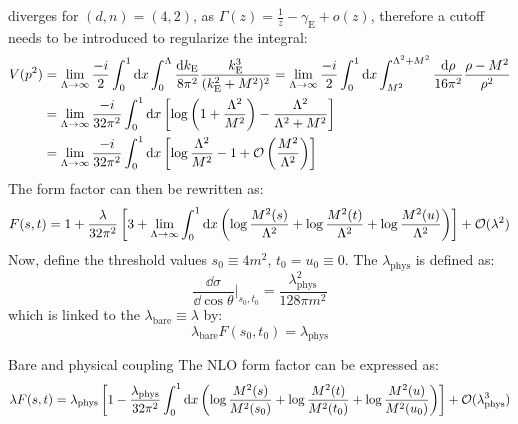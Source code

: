  diverges for $ (d,n) = (4,2) $, as $ \Gamma(z) = \frac{1}{z} - \gamma_\text{E} + o(z) $, therefore a cutoff needs to be introduced to regularize the integral:
\begin{equation*}
  \begin{split}
    V(p^2)
    & = \lim_{\Lambda \rightarrow \infty} \frac{-i}{2} \int_0^1 \mathrm{d} x \int_0^\Lambda \frac{\mathrm{d} k_\text{E}}{8\pi^2} \frac{k_\text{E}^3}{(k_\text{E}^2 + M^2)^2} = \lim_{\Lambda \rightarrow \infty} \frac{-i}{2} \int_0^1 \mathrm{d} x \int_{M^2}^{\Lambda^2 + M^2} \frac{\mathrm{d} \rho}{16\pi^2} \frac{\rho - M^2}{\rho^2} \\
    & = \lim_{\Lambda \rightarrow \infty} \frac{-i}{32 \pi^2} \int_0^1 \mathrm{d} x \left[ \log \left( 1 + \frac{\Lambda^2}{M^2} \right) - \frac{\Lambda^2}{\Lambda^2 + M^2} \right] \\
    & = \lim_{\Lambda \rightarrow \infty} \frac{-i}{32\pi^2} \int_0^1 \mathrm{d} x \left[ \log \frac{\Lambda^2}{M^2} - 1 + \mathcal{O}  \left( \frac{M^2}{\Lambda^2} \right) \right]
  \end{split}
\end{equation*}
The form factor can then be rewritten as:
\begin{equation}
  F(s,t) = 1 + \frac{\lambda}{32\pi^2} \left[ 3 + \lim_{\Lambda \rightarrow \infty} \int_0^1 \mathrm{d} x \left( \log \frac{M^2(s)}{\Lambda^2} + \log \frac{M^2(t)}{\Lambda^2} + \log \frac{M^2(u)}{\Lambda^2} \right) \right] + \mathcal{O}(\lambda^2)
  \label{eq:form-factor}
\end{equation}
Now, define the threshold values $ s_0 \equiv 4m^2 $, $ t_0 = u_0 \equiv 0 $. The  $ \lambda_\text{phys} $ is defined as:
\begin{equation}
  \frac{\dd \sigma}{\dd \cos \theta}\bigg\vert_{s_0 , t_0} = \frac{\lambda_\text{phys}^2}{128\pi m^2}
\end{equation}
which is linked to the  $ \lambda_\text{bare} \equiv \lambda $ by:
\begin{equation}
  \lambda_\text{bare} F(s_0,t_0) = \lambda_\text{phys}
  \label{eq:bare-phys-def}
\end{equation}

\begin{proposition}{Bare and physical coupling}{}
  The NLO form factor can be expressed as:
  \begin{equation}
    \lambda F(s,t) = \lambda_\text{phys} \left[ 1 - \frac{\lambda_\text{phys}}{32\pi^2} \int_0^1 \mathrm{d} x \left( \log \frac{M^2(s)}{M^2(s_0)} + \log \frac{M^2(t)}{M^2(t_0)} + \log \frac{M^2(u)}{M^2(u_0)} \right) \right] + \mathcal{O}(\lambda_\text{phys}^3)
  \end{equation}
\end{proposition}


